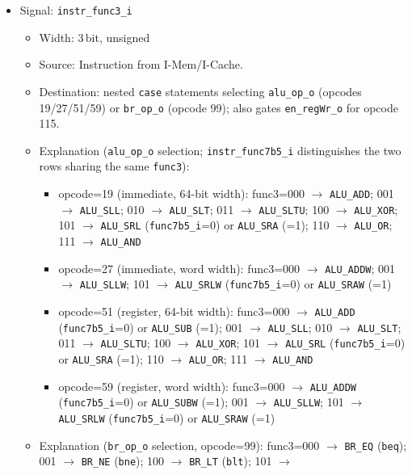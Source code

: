 \begin{itemize}
\begin{itemize}
  \end{itemize}
  \item Signal: \texttt{instr\_func3\_i}
  \begin{itemize}
    \item Width: 3\,bit, unsigned
    \item Source: Instruction from I-Mem/I-Cache.
    \item Destination: nested \texttt{case} statements selecting
      \texttt{alu\_op\_o} (opcodes 19/27/51/59) or \texttt{br\_op\_o}
      (opcode 99); also gates \texttt{en\_regWr\_o} for opcode 115.
    \item Explanation (\texttt{alu\_op\_o} selection; \texttt{instr\_func7b5\_i}
      distinguishes the two rows sharing the same \texttt{func3}):
    \begin{itemize}
      \item opcode=19 (immediate, 64-bit width): func3=000 $\to$
        \texttt{ALU\_ADD}; 001 $\to$ \texttt{ALU\_SLL}; 010 $\to$
        \texttt{ALU\_SLT}; 011 $\to$ \texttt{ALU\_SLTU}; 100 $\to$
        \texttt{ALU\_XOR}; 101 $\to$ \texttt{ALU\_SRL}
        (\texttt{func7b5\_i}=0) or \texttt{ALU\_SRA} (=1); 110 $\to$
        \texttt{ALU\_OR}; 111 $\to$ \texttt{ALU\_AND}
      \item opcode=27 (immediate, word width): func3=000 $\to$
        \texttt{ALU\_ADDW}; 001 $\to$ \texttt{ALU\_SLLW}; 101 $\to$
        \texttt{ALU\_SRLW} (\texttt{func7b5\_i}=0) or \texttt{ALU\_SRAW} (=1)
      \item opcode=51 (register, 64-bit width): func3=000 $\to$
        \texttt{ALU\_ADD} (\texttt{func7b5\_i}=0) or \texttt{ALU\_SUB} (=1);
        001 $\to$ \texttt{ALU\_SLL}; 010 $\to$ \texttt{ALU\_SLT}; 011 $\to$
        \texttt{ALU\_SLTU}; 100 $\to$ \texttt{ALU\_XOR}; 101 $\to$
        \texttt{ALU\_SRL} (\texttt{func7b5\_i}=0) or \texttt{ALU\_SRA} (=1);
        110 $\to$ \texttt{ALU\_OR}; 111 $\to$ \texttt{ALU\_AND}
      \item opcode=59 (register, word width): func3=000 $\to$
        \texttt{ALU\_ADDW} (\texttt{func7b5\_i}=0) or \texttt{ALU\_SUBW} (=1);
        001 $\to$ \texttt{ALU\_SLLW}; 101 $\to$ \texttt{ALU\_SRLW}
        (\texttt{func7b5\_i}=0) or \texttt{ALU\_SRAW} (=1)
    \end{itemize}
    \item Explanation (\texttt{br\_op\_o} selection, opcode=99): func3=000
      $\to$ \texttt{BR\_EQ} (\texttt{beq}); 001 $\to$ \texttt{BR\_NE}
      (\texttt{bne}); 100 $\to$ \texttt{BR\_LT} (\texttt{blt}); 101 $\to$

\end{itemize}
\end{itemize}

